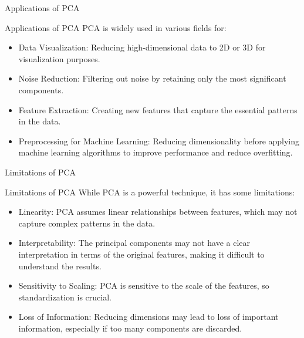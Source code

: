 \documentclass[hyperref={pdfpagelabels=false},aspectratio=169]{beamer}
\begin{document}
\begin{frame}[label={sec:org8d52197}]{Applications of PCA}
\begin{block}{Applications of PCA}
\pause
PCA is widely used in various fields for:
\begin{itemize}[<+->]
\item \alert{\alert{Data Visualization}}: Reducing high-dimensional data to 2D or 3D for visualization purposes.
\item \alert{\alert{Noise Reduction}}: Filtering out noise by retaining only the most significant components.
\item \alert{\alert{Feature Extraction}}: Creating new features that capture the essential patterns in the data.
\item \alert{\alert{Preprocessing for Machine Learning}}: Reducing dimensionality before applying machine learning algorithms to improve performance and reduce overfitting.
\end{itemize}
\end{block}
\end{frame}
\begin{frame}[label={sec:org0beef3e}]{Limitations of PCA}
\begin{block}{Limitations of PCA}
\pause
While PCA is a powerful technique, it has some limitations:
\begin{itemize}[<+->]
\item \alert{\alert{Linearity}}: PCA assumes linear relationships between features, which may not capture complex patterns in the data.
\item \alert{\alert{Interpretability}}: The principal components may not have a clear interpretation in terms of the original features, making it difficult to understand the results.
\item \alert{\alert{Sensitivity to Scaling}}: PCA is sensitive to the scale of the features, so standardization is crucial.
\item \alert{\alert{Loss of Information}}: Reducing dimensions may lead to loss of important information, especially if too many components are discarded.
\end{itemize}
\end{block}
\end{frame}
\end{document}
